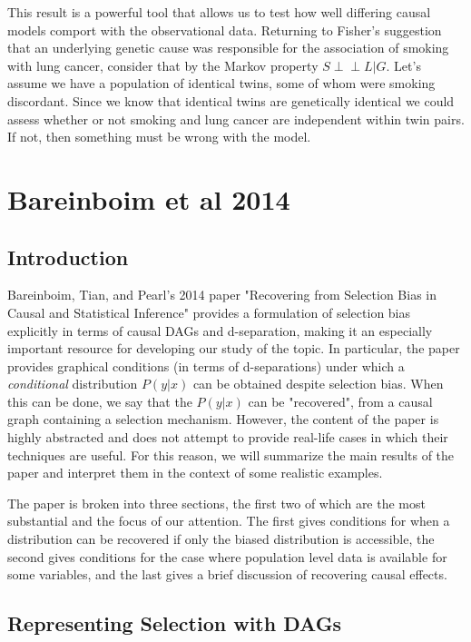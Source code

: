 \documentclass[12pt,twoside]{reedthesis}
\theoremstyle{definition}
\newcommand{\dsep}{\perp \!\!\!\perp}
\begin{document}
This result is a powerful tool that allows us to test how well differing causal models comport with the observational data.  Returning to Fisher's suggestion that an underlying genetic cause was responsible for the association of smoking with lung cancer, consider that by the Markov property $S \dsep L | G$. Let's assume we have a population of identical twins, some of whom were smoking discordant. Since we know that identical twins are genetically identical  we could assess whether or not smoking and lung cancer are independent within twin pairs. If not, then something must be wrong with the model. 
	

 \chapter{Bareinboim et al 2014}


\section{Introduction}
Bareinboim, Tian, and Pearl's 2014 paper "Recovering from Selection Bias in Causal and Statistical Inference" provides a formulation of selection bias explicitly in terms of causal DAGs and d-separation, making it an especially important resource for developing our study of the topic. In particular, the paper provides graphical conditions (in terms of d-separations) under which a \emph{conditional} distribution $P(y | x)$ can be obtained despite selection bias. When this can be done, we say that the $P(y | x)$ can be "recovered", from a causal graph containing a selection mechanism. However, the content of the paper is highly abstracted and does not attempt to provide real-life cases in which their techniques are useful. For this reason, we will summarize the main results of the paper and interpret them in the context of some realistic examples. 

The paper is broken into three sections, the first two of which are the most substantial and the focus of our attention. The first gives conditions for when a distribution can be recovered if only the biased distribution is accessible, the second gives conditions for the case where population level data is available for some variables, and the last gives a brief discussion of recovering causal effects.

\section{Representing Selection with DAGs}
\end{document}
